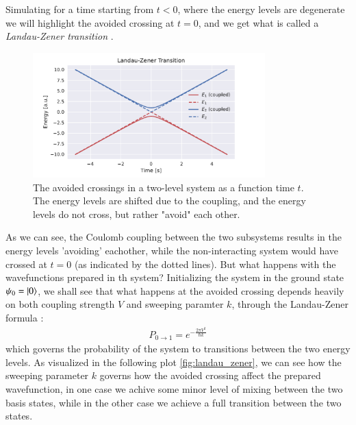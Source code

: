 \documentclass{subfiles}
\begin{document}
Simulating for a time starting from $t<0$, where the energy levels are degenerate we will highlight the avoided crossing at $t=0$, and we get what is called a \emph{Landau-Zener transition} \cite{landau1932theorie, zener1932non}. 
\begin{figure}[h!]
    \centering
    \includegraphics[width=0.8\textwidth]{figs/avoided_crossing.pdf}
    \caption{The avoided crossings in a two-level system as a function time $t$. The energy levels are shifted due to the coupling, and the energy levels do not cross, but rather "avoid" each other.}
    \label{fig:avoided_crossings}
\end{figure}
As we can see, the Coulomb coupling between the two subsystems results in the energy levels 'avoiding' eachother, while the non-interacting system would have crossed at $t=0$ (as indicated by the dotted lines). But what happens with the wavefunctions prepared in th system? Initializing the system in the ground state $\psi_0 = \ket{0}$, we shall see that what happens at the avoided crossing depends heavily on both coupling strength $V$ and sweeping paramter $k$, through the Landau-Zener formula \cite{landau1932theorie, zener1932non}:
\begin{align}
    P_{0\rightarrow1} = e^{-\frac{2\pi V^2}{\hbar k}}\label{eq:landau_zener_trans_prob}
\end{align}
which governs the probability of the system to transitions between the two energy levels. As visualized in the following plot \eqref{fig:landau_zener}, we can see how the sweeping parameter $k$ governs how the avoided crossing affect the prepared wavefunction, in one case we achive some minor level of mixing between the two basis states, while in the other case we achieve a full transition between the two states.
\end{document}
